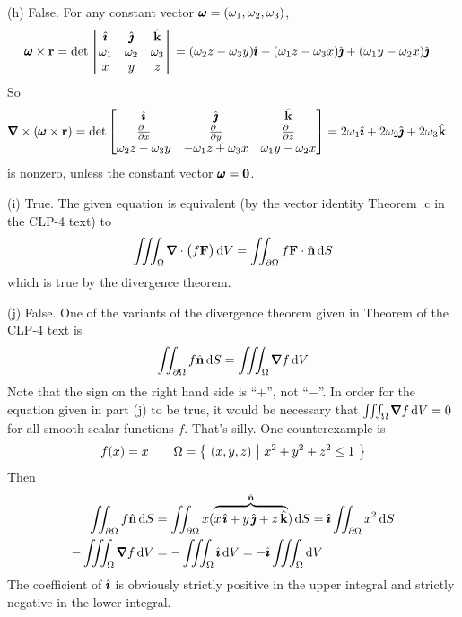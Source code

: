 \begin{solution}
(h) False.
For any constant vector $\pmb{\omega}=(\omega_1,\omega_2,\omega_3)$,
\begin{align*}
\pmb{\omega}\times\mathbf{r}
&=\det\left[\begin{matrix}
\hat{\pmb{\imath}} &\hat{\pmb{\jmath}} &\hat{\mathbf{k}} \\
\omega_1 & \omega_2 & \omega_3 \\
x   &  y  & z
\end{matrix}
\right]
= (\omega_2 z - \omega_3 y)\hat{\pmb{\imath}} 
 -(\omega_1 z - \omega_3 x)\hat{\pmb{\jmath}}
 +(\omega_1 y - \omega_2 x)\hat{\pmb{\jmath}}
\end{align*}
So 
\begin{align*}
\vnabla\times(\vom\times\vr)
&=\det\left[\begin{matrix}
\hi &\hj &\hk \\
\tfrac{\partial\hfill}{\partial x} & \tfrac{\partial\hfill}{\partial y} & 
                \tfrac{\partial\hfill}{\partial z} \\
\omega_2 z - \omega_3 y & -\omega_1 z + \omega_3 x & \omega_1 y - \omega_2 x
\end{matrix}
\right]
=2 \omega_1\hi + 2 \omega_2\hj + 2 \omega_3\hk 
\end{align*}
is nonzero, unless the constant vector $\pmb{\omega}=\mathbf{0}$.

(i) True. The given equation is equivalent (by the vector identity Theorem .c in
the CLP-4 text) to
\begin{equation*}
\tripInt_\Om \vnabla\cdot\big(f\vF\big)\,\dee{V}
 =\dblInt_{\partial\Om} f\vF\cdot\hn\,\dee{S}
\end{equation*}
which is true by the divergence theorem.

(j) False. One of the variants of the divergence theorem given
in Theorem  of the CLP-4 text is
\begin{equation*}
\dblInt_{\partial\Om} f\hn\,\dee{S}
  = \tripInt_\Om \vnabla f\,\dee{V}
\end{equation*}
Note that the sign on the right hand side is ``$+$'', not ``$-$''.
In order for the equation given in part (j) to be true, it would
be necessary that $\tripInt_\Om \vnabla f\,\dee{V}=0$ for all smooth
scalar functions $f$. That's silly. One counterexample is 
\begin{equation*}
f(x) = x\qquad
\Omega = \big\{ \ (x,y,z)\ \big|\ x^2+y^2+z^2\le 1\ \big\}
\end{equation*}
Then
\begin{align*}
\dblInt_{\partial\Om} f\hn\,\dee{S}
&=\dblInt_{\partial\Om}x(\overbrace{x\,\hi+y\,\hj+z\,\hk}^{\hn})\,\dee{S}
=\hi \dblInt_{\partial\Om}x^2\,\dee{S}
\\
- \tripInt_\Om \vnabla f\,\dee{V}
&=- \tripInt_\Om \hi\,\dee{V}
=- \hi\tripInt_\Om \dee{V}
\end{align*}
The coefficient of $\hat{\pmb{\imath}}$ is obviously strictly positive in the upper
integral and  strictly negative in the lower integral. 

\end{solution}

